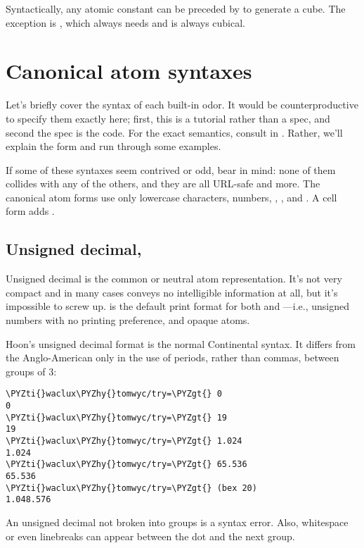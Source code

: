Syntactically, any atomic constant can be preceded by \kode{\%} to
generate a cube.  The exception is , which always needs \kode{\%}
and is always cubical.

\section{Canonical atom syntaxes}

Let's briefly cover the syntax of each built-in odor.  It would
be counterproductive to specify them exactly here; first, this is
a tutorial rather than a spec, and second the spec is the code.
For the exact semantics, consult  in .  Rather,
we'll explain the form and run through some examples.

If some of these syntaxes seem contrived or odd, bear in mind:
none of them collides with any of the others, and they are all
URL-safe and more.  The canonical atom forms use only lowercase 
characters, numbers, , \kode{-}, and \kode{\sig }.  A cell form adds \kode{\_}.

\subsection{Unsigned decimal, }

Unsigned decimal is the common or neutral atom representation.
It's not very compact and in many cases conveys no intelligible
information at all, but it's impossible to screw up.   is
the default print format for both  and ---i.e., unsigned
numbers with no printing preference, and opaque atoms.

Hoon's unsigned decimal format is the normal Continental syntax.
It differs from the Anglo-American only in the use of periods,
rather than commas, between groups of 3:

\begin{framed_shaded}
\begin{Verbatim}[fontsize=\relsize{-2.5},fontseries=b,commandchars=\\\{\}]
\PYZti{}waclux\PYZhy{}tomwyc/try=\PYZgt{} 0
0
\PYZti{}waclux\PYZhy{}tomwyc/try=\PYZgt{} 19
19
\PYZti{}waclux\PYZhy{}tomwyc/try=\PYZgt{} 1.024
1.024
\PYZti{}waclux\PYZhy{}tomwyc/try=\PYZgt{} 65.536
65.536
\PYZti{}waclux\PYZhy{}tomwyc/try=\PYZgt{} (bex 20)
1.048.576
\end{Verbatim}
\end{framed_shaded}
An unsigned decimal not broken into groups is a syntax error.
Also, whitespace or even linebreaks can appear between the dot
and the next group. 

